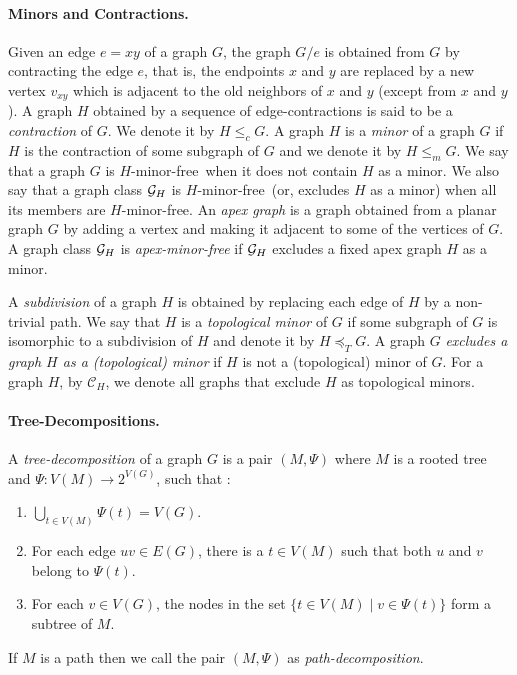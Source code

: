 \documentclass[11pt]{article}
\newcommand{\Hmf}{$H$-minor-free}
\begin{document}
\paragraph{Minors and Contractions.}
Given an edge  $e=xy$ of a graph $G$, the graph  $G/e$ is
obtained from  $G$ by contracting the edge $e$, that is,
the endpoints $x$  and $y$ are replaced by a new vertex $v_{xy}$
which  is  adjacent to the old neighbors of $x$ and $y$ (except
from $x$ and $y$).  A graph $H$ obtained by a sequence of
edge-contractions is said to be a \emph{contraction} of $G$.  We denote it by $H\leq_{c} G$.
A graph $H$ is a {\em minor} of a graph $G$ if $H$ is the contraction of some subgraph
of $G$ and we denote it by $H\leq_{m} G$.
We say that a graph $G$ is {\Hmf \,} when it does not
contain $H$ as a minor. We also say that a graph class ${\cal G}_H$
is {\Hmf \,} (or, excludes $H$ as a minor)  when
all its members are \Hmf.
An \emph{apex graph} is a graph obtained from a planar graph $G$
by adding a vertex and making it adjacent to some of the vertices of $G$.
A graph class ${\cal G}_H$ is \emph{apex-minor-free} if ${\cal G}_H$
excludes a fixed apex graph $H$ as a minor.





A \emph{subdivision} of a graph $H$ is obtained by replacing each edge of $H$ by a non-trivial path. We say that $H$ is a \emph{topological minor} of $G$ if some subgraph of $G$ is isomorphic to a subdivision of $H$ and denote it by $H\preceq_T G$. 
A graph $G$ \emph{excludes a graph $H$ as a (topological) minor} if $H$ is not a (topological) minor of $G$.  For a graph $H$, 
by $\mathcal{C}_H$, we denote all graphs that exclude $H$ as  topological minors.



















\paragraph{ Tree-Decompositions.} A \emph{tree-decomposition} of a graph $G$ is a pair $(M,\Psi)$ where $M$ 
is a rooted tree and $\Psi:V(M)\rightarrow 2^{V(G)}$, such that :

\begin{enumerate}
\item $\bigcup_{t\in V(M)}\Psi(t)=V(G)$.
\item For each edge $uv\in E(G)$, there is a $t\in V(M)$ such that both $u$ and $v$ belong to $\Psi(t)$.
\item For each $v\in V(G)$, the nodes in the set $\{t\in V(M)\mid v\in \Psi(t)\}$ form a subtree of $M$.
\end{enumerate}
If $M$ is a path then we call the pair  $(M,\Psi)$  as {\em path-decomposition}.
\end{document}
